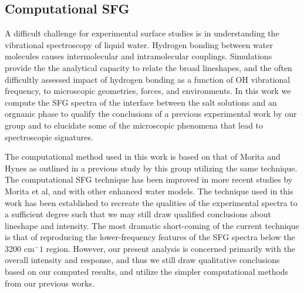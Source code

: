 


\subsection{Computational SFG}
A difficult challenge for experimental surface studies is in understanding the vibrational spectroscopy of liquid water. Hydrogen bonding between water molecules causes intermolecular and intramolecular couplings. Simulations provide the the analytical capacity to relate the broad lineshapes, and the often difficultly assessed impact of hydrogen bonding as a function of OH vibrational frequency, to microscopic geometries, forces, and environments. In this work we compute the SFG spectra of the interface between the salt solutions and an orgnanic phase to qualify the conclusions of a previous experimental work by our group\cite{McFearin2009} and to elucidate some of the microscopic phenomena that lead to spectroscopic signatures.

The computational method used in this work is based on that of Morita and Hynes\cite{Morita2000} as outlined in a previous study by this group utilizing the same technique.\cite{Walker2007} The computational SFG technique has been improved in more recent studies by Morita et al,\cite{Morita2002,Ishiyama2009} and with other enhanced water models. The technique used in this work has been established to recreate the qualities of the experimental spectra to a sufficient degree such that we may still draw qualified conclusions about lineshape and intensity. The most dramatic short-coming of the current technique is that of reproducing the lower-frequency features of the SFG spectra below the 3200 cm$^-1$ region. However, our present analysis is concerned primarily with the overall intensity and response, and thus we still draw qualitative conclusions based on our computed results, and utilize the simpler computational methods from our previous works.
